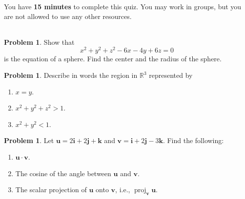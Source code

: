 \documentclass[12pt]{article}
\theoremstyle{plain}
\theoremstyle{definition}
\newtheorem{problem}[exercise]{Problem}
\theoremstyle{remark}
\DeclareMathOperator{\proj}{proj}
\newcommand{\bbR}{\mathbb{R}}
\newcommand{\bfu}{\mathbf{u}}
\newcommand{\bfv}{\mathbf{v}}
\begin{document}
\author{TA: \href{mailto:\authoremail}{\documentauthor}}
\title{\documenttitle}
\date{\today}
\maketitle

You have \textbf{15 minutes} to complete this quiz. You may work in groups,
but you are not allowed to use any other resources.
\\\\
\begin{problem}
Show that
\[
x^2+y^2+z^2-6x-4y+6z=0
\]
is the equation of a sphere. Find the center and the radius of the sphere.
\end{problem}
\bigskip
\begin{problem}
Describe in words the region in $\bbR^3$ represented by
\begin{enumerate}[label=(\alph*)]
\item $x=y$.
\item $x^2+y^2+z^2>1$.
\item $x^2+y^2<1$.
\end{enumerate}
\end{problem}
\bigskip
\begin{problem}
Let $\bfu=2\mathbf{i}+2\mathbf{j}+\mathbf{k}$ and
$\bfv=\mathbf{i}+2\mathbf{j}-3\mathbf{k}$. Find the following:
\begin{enumerate}[label=(\alph*)]
\item $\bfu\cdot\bfv$.
\item The cosine of the angle between $\bfu$ and $\bfv$.
\item The scalar projection of $\bfu$ onto $\bfv$, i.e.,
  $\proj_{\bfv}\bfu$.
\end{enumerate}
\end{problem}
\end{document}
